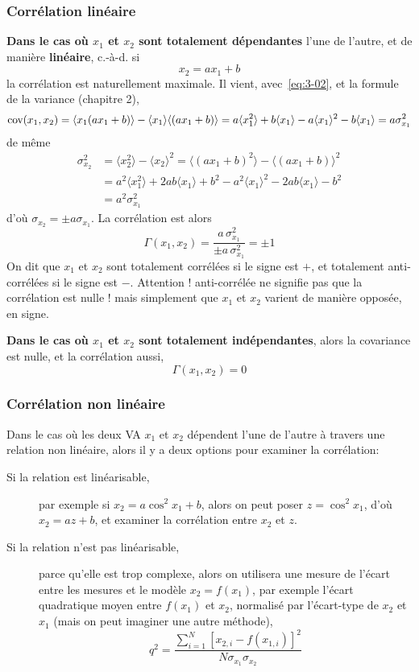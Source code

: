 \documentclass[main.tex]{subfiles}
\begin{document}
\subsubsection{Corrélation linéaire}

\noindent\textbf{Dans le cas où $x_1$ et $x_2$ sont totalement dépendantes} l'une de l'autre, et de manière \textbf{linéaire}, c.-à-d. si
$$
    x_2=ax_1+b
$$
la corrélation est naturellement maximale. Il vient, avec~\ref{eq:3-02}, et la formule de la variance (chapitre 2),
$$
    \text{cov}(x_1,x_2)=\langle x_1(ax_1+b)\rangle-\langle x_1\rangle\langle(ax_1+b)\rangle
    =a\langle x_1^2\rangle+b\langle x_1\rangle-a\langle x_1\rangle^2-b\langle x_1\rangle
    =a\sigma_{x_1}^2
$$
de même
\begin{align*}
    \sigma_{x_2}^2 & =\langle x_2^2\rangle-\langle x_2\rangle^2=
    \langle (ax_1+b)^2\rangle-\langle (ax_1+b)\rangle^2                                                                   \\
                   & =a^2\langle x_1^2\rangle+2ab\langle x_1\rangle+b^2-a^2\langle x_1\rangle^2-2ab\langle x_1\rangle-b^2 \\
                   & =a^2\sigma_{x_1}^2
\end{align*}
d'où $\sigma_{x_2}=\pm a\sigma_{x_1}$. La corrélation est alors
$$
    \Gamma(x_1,x_2)=\frac{a\,\sigma_{x_1}^2}{\pm a\,\sigma_{x_1}^2}=\pm 1
$$
On dit que $x_1$ et $x_2$ sont totalement corrélées si le signe est $+$, et totalement anti-corrélées si le signe est $-$. Attention ! anti-corrélée ne signifie pas que la corrélation est nulle ! mais simplement que $x_1$ et $x_2$ varient de manière opposée, en signe.

\noindent\textbf{Dans le cas où $x_1$ et $x_2$ sont totalement indépendantes}, alors la covariance est nulle, et la corrélation aussi,
$$
    \Gamma(x_1,x_2)=0
$$

\subsubsection{Corrélation non linéaire}

Dans le cas où les deux VA $x_1$ et $x_2$ dépendent l'une de l'autre à travers une relation non linéaire, alors il y a deux options pour examiner la corrélation:
\begin{description}
    \item[Si la relation est linéarisable,] par exemple si $x_2=a\cos^2x_1+b$, alors on peut poser $z=\cos^2x_1$, d'où $x_2=az+b$, et examiner la corrélation entre $x_2$ et $z$.
    \item[Si la relation n'est pas linéarisable,] parce qu'elle est trop complexe, alors on utilisera une mesure de l'écart entre les mesures et le modèle $x_2=f(x_1)$, par exemple l'écart quadratique moyen entre $f(x_1)$ et $x_2$, normalisé par l'écart-type de $x_2$ et $x_1$ (mais on peut imaginer une autre méthode),
          $$
              q^2=\frac{\sum_{i=1}^{N}\left[x_{2,i}-f(x_{1,i})\right]^2}{N\sigma_{x_1}\sigma_{x_2}}
          $$
\end{description}
\end{document}
